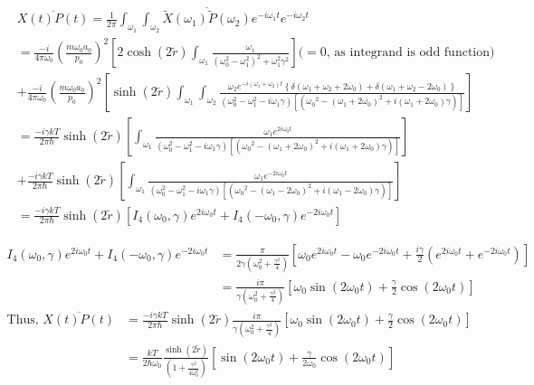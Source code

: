 \documentclass[12pt, twoside]{article}
\begin{document}
$\begin{aligned} &\overline{X( t ) P(t)} = \frac { 1 } { 2 \pi } \int _ { \omega _ { 1 }}\int_{\omega_2} \overline{\widetilde { X } ( \omega_1 )\widetilde { P } ( \omega_2 )}  e ^ { - i \omega _ { 1 } t } e ^ { - i \omega _ { 2 } t } \\ &= \frac{-i}{4\pi \omega_0}\left(\frac { m \omega _ { 0 } a_0 } { p _ { 0 } }\right)^2 \left[ 2 \cosh(2\tilde{r}) \int_{\omega_1} \frac{\omega_1}{(\omega_0^2 - \omega_1 ^2)^2 + \omega_1 ^2 \gamma^2}\right] \text{($=0$, as integrand is odd function)} \\&+ \frac{-i}{4\pi\omega_0}\left(\frac { m \omega _ { 0 } a_0 } { p _ { 0 } }\right)^2 \left[ \sinh(2\tilde{r}) \int_{\omega_1}\int_{\omega_2} \frac{\omega_2 e^{-i(\omega_1 + \omega_2) t} \left\{\delta(\omega_1 + \omega_2 + 2\omega_0) + \delta(\omega_1 + \omega_2 - 2\omega_0) \right\}}{(\omega_0^2 - \omega_1 ^2 - i\omega_1\gamma) [({\omega_0}^2 - (\omega_1 + 2\omega_0)^2 + i(\omega_1 + 2 \omega_0) \gamma)]}\right] \\&= \frac{-i\gamma k T}{2 \pi \hbar} \sinh(2\tilde{r}) \left[\int_{\omega_1} \frac{\omega_1 e^{2i\omega_0 t}}{(\omega_0^2 - \omega_1 ^2 - i\omega_1\gamma) [({\omega_0}^2 - (\omega_1 + 2\omega_0)^2 + i(\omega_1 + 2 \omega_0) \gamma)]} \right] \\ &+ \frac{-i\gamma k T}{2 \pi \hbar} \sinh(2\tilde{r}) \left[\int_{\omega_1} \frac{\omega_1 e^{-2i\omega_0 t}}{(\omega_0^2 - \omega_1 ^2 - i\omega_1\gamma) [({\omega_0}^2 - (\omega_1 - 2\omega_0)^2 + i(\omega_1 - 2 \omega_0) \gamma)]}   \right] \\& = \frac{-i\gamma k T}{2 \pi \hbar} \sinh(2\tilde{r}) \left[I_4(\omega_0,\gamma) e^{2i\omega_0 t} + I_4(-\omega_0,\gamma)e^{-2i\omega_0 t}\right]
\end{aligned}$

$\begin{aligned}
I_4(\omega_0,\gamma) e^{2i\omega_0 t} + I_4(-\omega_0,\gamma)e^{-2i\omega_0 t} &= \frac{\pi}{2\gamma(\omega_0 ^2 + \frac{\gamma^2}{4})} \left[\omega_0 e^{2i\omega_0 t} - \omega_{ 0 } e^{-2 i \omega_0 t} + \frac{i\gamma}{2}(e^{2i\omega_0 t} + e^{-2i \omega_0 t})\right]
\\&= \frac{i \pi}{\gamma(\omega_0 ^2 + \frac{\gamma^2}{4})} \left[\omega_0 \sin(2\omega_0 t) + \frac{\gamma}{2}\cos(2\omega_0 t)\right]
\end{aligned}$
\begin{equation}\label{eq: x_p_average}
\begin{aligned}
\text{Thus, } \overline{X( t ) P(t)} &= \frac{-i\gamma k T}{2 \pi \hbar} \sinh(2\tilde{r}) \frac{i \pi}{\gamma(\omega_0 ^2 + \frac{\gamma^2}{4})} \left[\omega_0 \sin(2\omega_0 t) + \frac{\gamma}{2}\cos(2\omega_0 t)\right] \\&= \frac{k T}{2 \hbar \omega_0}  \frac{\sinh(2\tilde{r})}{(1 + \frac{\gamma^2}{4\omega_0 ^2})} \left[ \sin(2\omega_0 t) + \frac{\gamma}{2\omega_0}\cos(2\omega_0 t)\right]
\end{aligned}
\end{equation}
\end{document}
